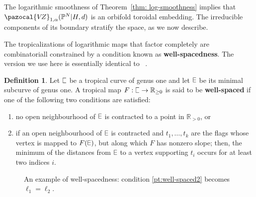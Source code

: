 \documentclass[11pt]{amsart}
\DeclareRobustCommand{\plE}{\text{\reflectbox{$\exists$}}}
\newcommand{\plC}{\scalebox{0.8}[1.3]{$\sqsubset$}}
\newcommand{\VZ}{\pazocal{V\!Z}}
\renewcommand{\to}{\rightarrow}
\theoremstyle{definition}
\theoremstyle{definition}
\newtheorem{definition}[thm]{Definition}
\begin{document}
\noindent The logarithmic smoothness of Theorem~\ref{thm: log-smoothness} implies that $\VZ_{1,\alpha}(\mathbb P^N|H,d)$ is an orbifold toroidal embedding. The irreducible components of its boundary stratify the space, as we now describe.

The tropicalizations of logarithmic maps that factor completely are combinatoriall constrained by a condition known as \textbf{well-spacedness}. The version we use here is essentially identical to~
\cite{RSPW2}. 

\begin{definition}
Let $\plC$ be a tropical curve of genus one and let $\plE$ be its minimal subcurve of genus one. A tropical map $F: \plC\to \mathbb R_{\geq 0}$ is said to be \textbf{well-spaced} if one of the following two conditions are satisfied:
\begin{enumerate}
    \item no open neighbourhood of $\plE$ is contracted to a point in $\mathbb R_{>0}$, or
    \item\label{pt:well-spaced2} if an open neighbourhood of $\plE$ is contracted and $t_1,\ldots,t_k$ are the flags whose vertex is mapped to $F(\plE)$, but along which $F$ has nonzero slope; then, the minimum of the distances from $\plE$ to a vertex supporting $t_i$ occurs for at least two indices $i$.
\end{enumerate}
\end{definition}

\begin{figure}
\caption{An example of well-spacedness: condition \eqref{pt:well-spaced2} becomes $\ell_1=\ell_2$.}
\label{fig:exa_well-spaced}
\end{figure}
\end{document}
